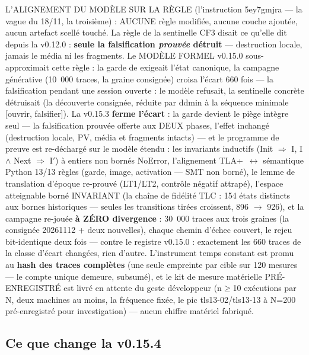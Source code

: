 L'ALIGNEMENT DU MODÈLE SUR LA RÈGLE (l'instruction 5ey7gmjra — la vague
du 18/11, la troisième) : AUCUNE règle modifiée, aucune couche ajoutée,
aucun artefact scellé touché. La règle de la sentinelle CF3 disait ce
qu'elle dit depuis la v0.12.0 : \textbf{seule la falsification
\emph{prouvée} détruit} — destruction locale, jamais le média ni les
fragments. Le MODÈLE FORMEL v0.15.0 sous-approximait cette règle : la
garde de  exigeait l'état canonique, la
campagne générative (10~000 traces, la graine consignée) croisa l'écart
660 fois — la falsification pendant une session ouverte : le modèle
refusait, la sentinelle concrète détruisait (la découverte consignée,
réduite par ddmin à la séquence minimale [ouvrir, falsifier]). La
v0.15.3 \textbf{ferme l'écart} : la garde devient le piège intègre
seul — la falsification prouvée offerte aux DEUX phases, l'effet
inchangé (destruction locale, PV, média et fragments intacts) — et le
programme de preuve est re-déchargé sur le modèle étendu : les
invariants inductifs (Init $\Rightarrow$ I, I $\wedge$ Next
$\Rightarrow$ I$'$) à entiers non bornés NoError, l'alignement
TLA+~$\leftrightarrow$ sémantique Python 13/13 règles (garde, image,
activation — SMT non borné), le lemme de translation d'époque re-prouvé
(LT1/LT2, contrôle négatif attrapé), l'espace atteignable borné
INVARIANT (la chaîne de fidélité TLC : 154 états distincts aux bornes
historiques — seules les transitions tirées croissent, 896 $\to$ 926),
et la campagne re-jouée \textbf{à ZÉRO divergence} : 30~000 traces aux
trois graines (la consignée 20261112 + deux nouvelles), chaque chemin
d'échec couvert, le rejeu bit-identique deux fois — contre le registre
v0.15.0 : exactement les 660 traces de la classe d'écart changées, rien
d'autre. L'instrument temps constant est promu au \textbf{hash des
traces complètes} (une seule empreinte par cible sur 120 mesures — le
compte unique demeure, subsumé), et le kit de mesure matérielle
PRÉ-ENREGISTRÉ est livré en attente du geste développeur (n$\ge$10
exécutions par N, deux machines au moins, la fréquence fixée, le pic
tls13-02/tls13-13 à N=200 pré-enregistré pour investigation) — aucun
chiffre matériel fabriqué.

\subsection{Ce que change la v0.15.4}\label{sec:nouveautes154}

